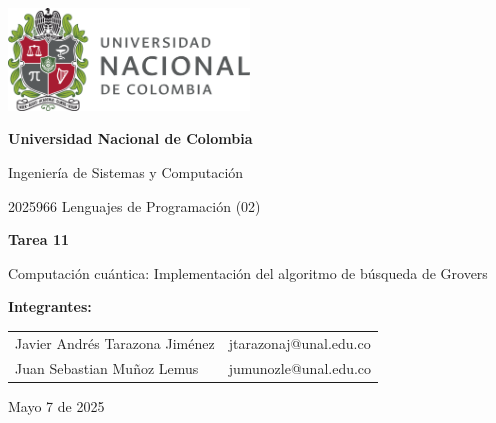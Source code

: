 \documentclass{article}
\begin{document}
\begin{titlepage}
    \centering
    \includegraphics[width=0.48\textwidth]{logo_universidad.png}
    \par\vspace{2cm}

    {\Large \textbf{Universidad Nacional de Colombia} \par}
    \vspace{0.5cm}
    {\large Ingeniería de Sistemas y Computación \par}
    {\large 2025966 Lenguajes de Programación (02)\par}
    \vspace{3cm}
    {\large \textbf{Tarea 11} \par}
    {\large Computación cuántica: Implementación del algoritmo de búsqueda de Grovers \par}
    \vspace{3cm}
    {\large \textbf{Integrantes:} \par}
    \vspace{0.5cm}
    \begin{tabular}{ll}
    Javier Andrés Tarazona Jiménez & jtarazonaj@unal.edu.co \\
    Juan Sebastian Muñoz Lemus & jumunozle@unal.edu.co \\
    \end{tabular}
    \par\vspace{3cm}

    {\large Mayo 7 de 2025 \par}
\end{titlepage}

\tableofcontents %

\newpage %


\end{document}
